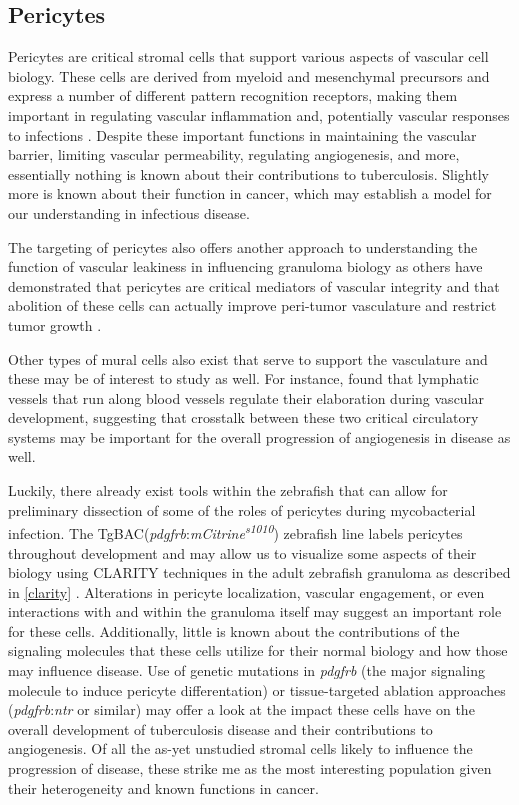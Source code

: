 \subsection{Pericytes}

Pericytes are critical stromal cells that support various aspects of vascular cell biology. These cells are derived from myeloid and mesenchymal precursors and express a number of different pattern recognition receptors, making them important in regulating vascular inflammation and, potentially vascular responses to infections \citep{Yamazaki2018, Stark2013}. Despite these important functions in maintaining the vascular barrier, limiting vascular permeability, regulating angiogenesis, and more, essentially nothing is known about their contributions to tuberculosis. Slightly more is known about their function in cancer, which may establish a model for our understanding in infectious disease.



The targeting of pericytes also offers another approach to understanding the function of vascular leakiness in influencing granuloma biology as others have demonstrated that pericytes are critical mediators of vascular integrity and that abolition of these cells can actually improve peri-tumor vasculature and restrict tumor growth \citep{Keskin2015}.

Other types of mural cells also exist that serve to support the vasculature and these may be of interest to study as well. For instance, \citet{Bower2017b} found that lymphatic vessels that run along blood vessels regulate their elaboration during vascular development, suggesting that crosstalk between these two critical circulatory systems may be important for the overall progression of angiogenesis in disease as well. 

Luckily, there already exist tools within the zebrafish that can allow for preliminary dissection of some of the roles of pericytes during mycobacterial infection. The TgBAC(\textit{pdgfrb}:\textit{mCitrine\textsuperscript{s1010}}) zebrafish line labels pericytes throughout development and may allow us to visualize some aspects of their biology using CLARITY techniques in the adult zebrafish granuloma as described in \autoref{clarity} \citep{Vanhollebeke2015}. Alterations in pericyte localization, vascular engagement, or even interactions with and within the granuloma itself may suggest an important role for these cells. Additionally, little is known about the contributions of the signaling molecules that these cells utilize for their normal biology and how those may influence disease. Use of genetic mutations in \textit{pdgfrb} (the major signaling molecule to induce pericyte differentation) or tissue-targeted ablation approaches (\textit{pdgfrb}:\textit{ntr} or similar) may offer a look at the impact these cells have on the overall development of tuberculosis disease and their contributions to angiogenesis. Of all the as-yet unstudied stromal cells likely to influence the progression of disease, these strike me as the most interesting population given their heterogeneity and known functions in cancer.

